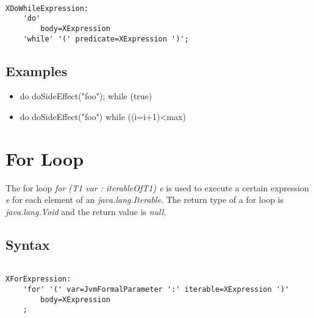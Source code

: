\documentclass[a4paper,10pt]{scrreprt}
\newlength{\itemindentlen}
\begin{document}
\begin{lstlisting}

XDoWhileExpression:
	'do'
		body=XExpression
	'while' '(' predicate=XExpression ')';

\end{lstlisting}
 




\subsection{ Examples }


\setlength{\itemindentlen}{\textwidth}
\begin{itemize}
\addtolength{\itemindentlen}{-2em}

\item \begin{minipage}[t]{\itemindentlen}

	do {
		doSideEffect("foo");
	} while (true)
	
\end{minipage}

\item \begin{minipage}[t]{\itemindentlen}

	do doSideEffect("foo") while ((i=i+1)<max)
	
\end{minipage}

\end{itemize}
\addtolength{\itemindentlen}{2em}







\section{For Loop}
\label{ForeachExpression}

The for loop \emph{for (T1 var : iterableOfT1) e} is used to execute a certain expression \emph{e} for each element of an \emph{java.lang.Iterable}.
The return type of a for loop is \emph{java.lang.Void} and the return value is \emph{null}.

\subsection{ Syntax }


\begin{lstlisting}

XForExpression:
	'for' '(' var=JvmFormalParameter ':' iterable=XExpression ')' 
		body=XExpression
	;

\end{lstlisting}
 
\end{document}
